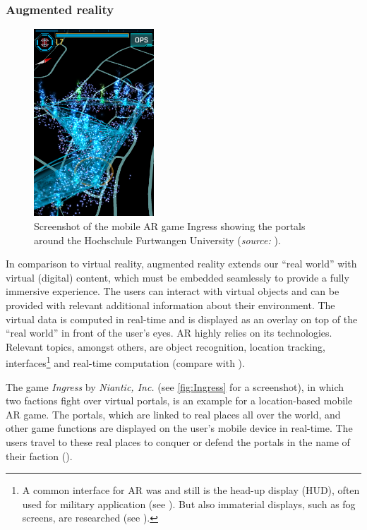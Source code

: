\subsubsection{Augmented reality}
\begin{figure}[htbp]
		\centering
		\includegraphics[width=0.4\textwidth]{figures/Ingress}
		\caption[Screenshot of the mobile AR game Ingress]{Screenshot of the mobile AR game Ingress showing the portals around the Hochschule Furtwangen University (\textit{source:} \cite{Haefele.2014}).}
		\label{fig:Ingress}
\end{figure}
In comparison to virtual reality, augmented reality  extends our \enquote{real world} with virtual (digital) content, which must be embedded seamlessly to provide a fully immersive experience. The users can interact with virtual objects and can be provided with relevant additional information about their environment. The virtual data is computed in real-time and is displayed as an overlay on top of the \enquote{real world} in front of the user's eyes. AR highly relies on its technologies. Relevant topics, amongst others, are object recognition, location tracking, interfaces\footnote{A common interface for AR was and still is the head-up display (HUD), often used for military application (see \cite[p.6]{Burdea.2003}). But also immaterial displays, such as fog screens, are researched (see \cite[p.25 et seq.]{Toennis.2010}).} and real-time computation (compare with \cite[p.1 et seqq.]{Toennis.2010}). 

The game \textit{Ingress} by \textit{Niantic, Inc.} (see \autoref{fig:Ingress} for a screenshot), in which two factions fight over virtual portals, is an example for a location-based mobile AR game. The portals, which are linked to real places all over the world, and other game functions are displayed on the user's mobile device in real-time. The users travel to these real places to conquer or defend the portals in the name of their faction (\cite{Niantic.2016}). 

